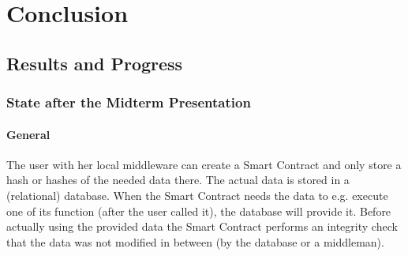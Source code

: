 \section{Conclusion}
\subsection{Results and Progress}
\subsubsection{State after the Midterm Presentation}
\paragraph{General}

The user with her local middleware can create a Smart Contract and only store a hash or hashes of the needed data there. The actual data is stored in a (relational) database. When the Smart Contract needs the data to e.g. execute one of its function (after the user called it), the database will provide it. Before actually using the provided data the Smart Contract performs an integrity check that the data was not modified in between (by the database or a middleman).






